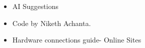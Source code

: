 \begin{itemize}
    \item AI Suggestions
    \item Code by Niketh Achanta.
    \item Hardware connections guide- Online Sites
\end{itemize}
